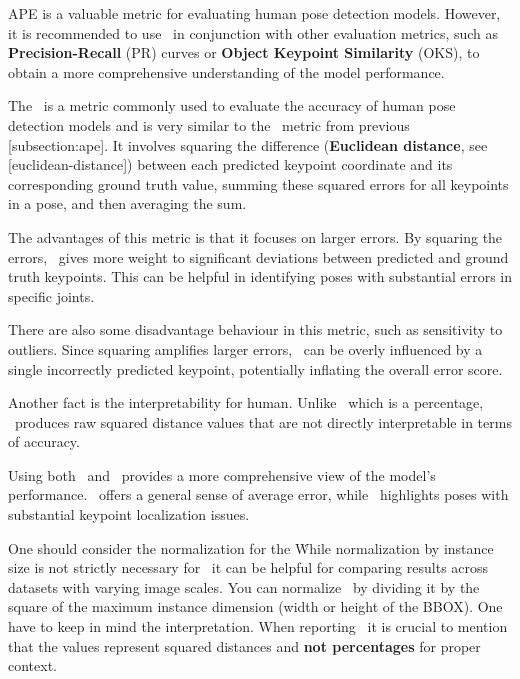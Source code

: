 APE is a valuable metric for evaluating human pose detection models. However, it is recommended to use \APE\ in conjunction with other evaluation metrics, such as {\bf Precision-Recall} (PR) curves or {\bf Object Keypoint Similarity} (OKS), to obtain a more comprehensive understanding of the model performance.

The \MSE\ is a metric commonly used to evaluate the accuracy of human pose detection models and is very similar to the \APE\ metric from previous [subsection:ape]. It involves squaring the difference ({\bf Euclidean distance}, see [euclidean-distance]) between each predicted keypoint coordinate and its corresponding ground truth value, summing these squared errors for all keypoints in a pose, and then averaging the sum.

The advantages of this metric is that it focuses on larger errors. By squaring the errors, \MSE\ gives more weight to significant deviations between predicted and ground truth keypoints. This can be helpful in identifying poses with substantial errors in specific joints.

There are also some disadvantage behaviour in this metric, such as sensitivity to outliers. Since squaring amplifies larger errors, \MSE\ can be overly influenced by a single incorrectly predicted keypoint, potentially inflating the overall error score.

Another fact is the interpretability for human. Unlike \APE\, which is a percentage, \MSE\ produces raw squared distance values that are not directly interpretable in terms of accuracy.


Using both \APE\ and \MSE\ provides a more comprehensive view of the model's performance. \APE\ offers a general sense of average error, while \MSE\ highlights poses with substantial keypoint localization issues.

One should consider the normalization for the \MSE\. While normalization by instance size is not strictly necessary for \MSE\, it can be helpful for comparing results across datasets with varying image scales. You can normalize \MSE\ by dividing it by the square of the maximum instance dimension (width or height of the BBOX).
One have to keep in mind the interpretation. When reporting \MSE\, it is crucial to mention that the values represent squared distances and {\bf not percentages} for proper context.

